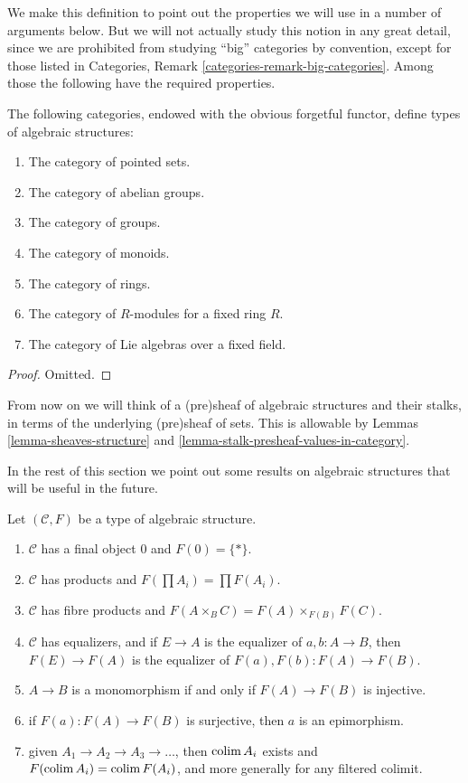 \noindent
We make this definition to point out the properties
we will use in a number of arguments below.  But we will
not actually study this notion in any great detail, since we
are prohibited from studying ``big'' categories by convention,
except for those listed in
Categories, Remark \ref{categories-remark-big-categories}.
Among those the following have the required properties.

\begin{lemma}
\label{lemma-list-algebraic-structures}
The following categories, endowed with the obvious forgetful
functor, define types of algebraic structures:
\begin{enumerate}
\item The category of pointed sets.
\item The category of abelian groups.
\item The category of groups.
\item The category of monoids.
\item The category of rings.
\item The category of $R$-modules for a fixed ring $R$.
\item The category of Lie algebras over a fixed field.
\end{enumerate}
\end{lemma}

\begin{proof}
Omitted.
\end{proof}

\noindent
From now on we will think of a (pre)sheaf of algebraic structures
and their stalks, in terms of the underlying (pre)sheaf of sets.
This is allowable by Lemmas \ref{lemma-sheaves-structure} and
\ref{lemma-stalk-presheaf-values-in-category}.

\medskip\noindent
In the rest of this section we point out some results
on algebraic structures that will be useful in the future.

\begin{lemma}
\label{lemma-properties-algebraic-structures}
Let $(\mathcal{C}, F)$ be a type of algebraic structure.
\begin{enumerate}
\item $\mathcal{C}$ has a final object $0$ and $F(0) = \{ * \}$.
\item $\mathcal{C}$ has products and $F(\prod A_i) = \prod F(A_i)$.
\item $\mathcal{C}$ has fibre products and
$F(A \times_B C) = F(A)\times_{F(B)}F(C)$.
\item $\mathcal{C}$ has equalizers, and if $E \to A$
is the equalizer of $a, b : A \to B$, then
$F(E) \to F(A)$ is the equalizer of $F(a), F(b) : F(A) \to F(B)$.
\item $A \to B$ is a monomorphism if and only if
$F(A) \to F(B)$ is injective.
\item if $F(a) : F(A) \to F(B)$ is surjective, then
$a$ is an epimorphism.
\item given $A_1 \to A_2 \to A_3 \to \ldots$, then
$\mathop{\mathrm{colim}}\nolimits A_i$ exists and $F(\mathop{\mathrm{colim}}\nolimits A_i) = \mathop{\mathrm{colim}}\nolimits F(A_i)$,
and more generally for any filtered colimit.
\end{enumerate}
\end{lemma}


